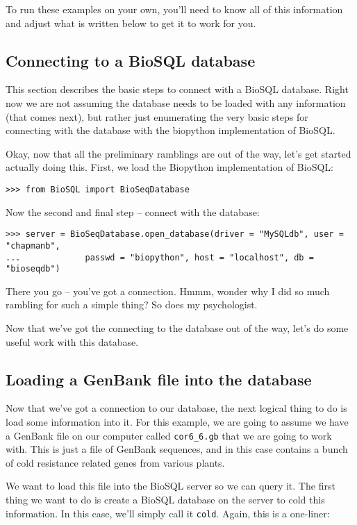 \documentclass{article}
\begin{document}
To run these examples on your own, you'll need to know all of this
information and adjust what is written below to get it to work for you.

\subsection{Connecting to a BioSQL database}

This section describes the basic steps to connect with a BioSQL
database. Right now we are not assuming the database needs to be loaded
with any information (that comes next), but rather just enumerating the 
very basic steps for connecting with the database with the biopython
implementation of BioSQL.


Okay, now that all the preliminary ramblings are out of the way, let's
get started actually doing this. First, we load the Biopython
implementation of BioSQL:

\begin{verbatim}
>>> from BioSQL import BioSeqDatabase
\end{verbatim}

Now the second and final step -- connect with the database:

\begin{verbatim}
>>> server = BioSeqDatabase.open_database(driver = "MySQLdb", user = "chapmanb",
...             passwd = "biopython", host = "localhost", db = "bioseqdb")
\end{verbatim}

There you go -- you've got a connection. Hmmm, wonder why I did so much
rambling for such a simple thing? So does my psychologist.


Now that we've got the connecting to the database out of the way, let's
do some useful work with this database.

\subsection{Loading a GenBank file into the database}

Now that we've got a connection to our database, the next logical thing
to do is load some information into it. For this example, we are going
to assume we have a GenBank file on our computer called
\verb|cor6_6.gb| that we are going to work with. This is just a file of
GenBank sequences, and in this case contains a bunch of cold resistance
related genes from various plants. 


We want to load this file into the BioSQL server so we can query it.
The first thing we want to do is create a BioSQL database on the server
to cold this information. In this case, we'll simply call it
\verb|cold|. Again, this is a one-liner:
\end{document}
